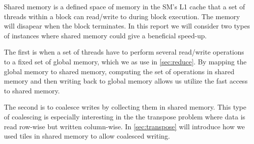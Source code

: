 Shared memory is a defined space of memory in the SM's L1 cache that a set of threads within a block can read/write to during block execution.
The memory will disapear when the block terminates.
In this report we will consider two types of instances where shared memory could give a beneficial speed-up.

The first is when a set of threads have to perform several read/write operations to a fixed set of global memory, which we as use in \cref{sec:reduce}.
By mapping the global memory to shared memory, computing the set of operations in shared memory and then writing back to global memory allows us utilize the fast access to shared memory.

The second is to coalesce writes by collecting them in shared memory.
This type of coalescing is especially interesting in the the transpose problem where data is read row-wise but written column-wise. In \cref{sec:transpose} will introduce how we used tiles in shared memory to allow coalesced writing.
